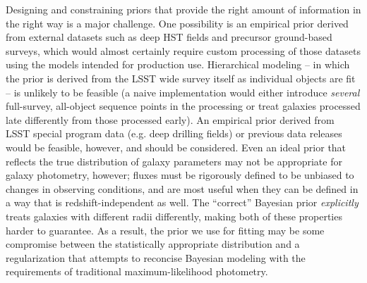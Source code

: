 Designing and constraining priors that provide the right amount of information in the right way is a major challenge.  One possibility is an empirical prior derived from external datasets such as deep HST fields and precursor ground-based surveys, which would almost certainly require custom processing of those datasets using the models intended for production use.  Hierarchical modeling -- in which the prior is derived from the LSST wide survey itself as individual objects are fit -- is unlikely to be feasible (a naive implementation would either introduce \emph{several} full-survey, all-object sequence points in the processing or treat galaxies processed late differently from those processed early).  An empirical prior derived from LSST special program data (e.g. deep drilling fields) or previous data releases would be feasible, however, and should be considered.  Even an ideal prior that reflects the true distribution of galaxy parameters may not be appropriate for galaxy photometry, however; fluxes must be rigorously defined to be unbiased to changes in observing conditions, and are most useful when they can be defined in a way that is redshift-independent as well.  The ``correct'' Bayesian prior \emph{explicitly} treats galaxies with different radii differently, making both of these properties harder to guarantee.  As a result, the prior we use for fitting may be some compromise between the statistically appropriate distribution and a regularization that attempts to reconcise Bayesian modeling with the requirements of traditional maximum-likelihood photometry.

